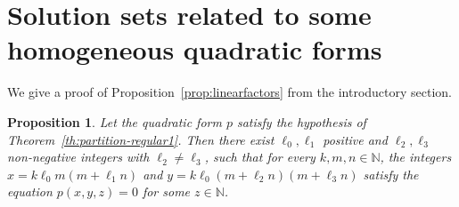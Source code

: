 \documentclass[11pt]{amsart}
\newtheorem*{proposition*}{Proposition}
\theoremstyle{definition}
\begin{document}
\section{Solution sets related to some homogeneous quadratic forms} \label{SS:AppNumberTheory}
We give a proof  of    Proposition~\ref{prop:linearfactors} from the
 introductory section.
 
\begin{proposition*}
Let the quadratic form $p$ satisfy the hypothesis of
Theorem~\ref{th:partition-regular1}. Then there exist
$\ell_0,\ell_1$ positive and $\ell_2,\ell_3$ non-negative integers
with $\ell_2\neq \ell_3$,  such that for every $k,m,n\in {{\mathbb N}}$, the
integers $x=k\ell_0 m(m+\ell_1n)$ and $y=
k\ell_0(m+\ell_2n)(m+\ell_3n)$ satisfy the equation $p(x,y,z)=0$
for some $z\in {{\mathbb N}}$.
\end{proposition*}
\end{document}
